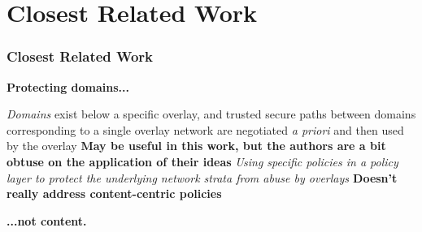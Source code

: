 \section{Closest Related Work}
\begin{frame}
\frametitle{Closest Related Work}
\begin{beamerboxesrounded}[shadow]{}
\textbf{Protecting domains...}
\end{beamerboxesrounded}
\textit{Domains} exist below a specific overlay, and trusted secure paths between domains corresponding to a single overlay network are negotiated \textit{a priori} and then used by the overlay \cite{4457175}
\newline
\newline
\textbf{May be useful in this work, but the authors are a bit obtuse on the application of their ideas}
\newline
\newline
\textit{Using specific policies in a policy layer to protect the underlying network strata from abuse by overlays \cite{4404172}}
\newline
\newline
\textbf{Doesn't really address content-centric policies}
\newline
\newline
\begin{beamerboxesrounded}[shadow]{}
\textbf{...not content.}
\end{beamerboxesrounded}
\end{frame}